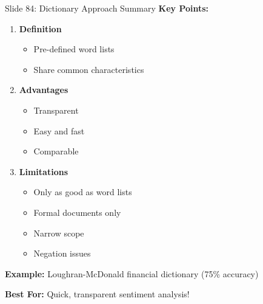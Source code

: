 \documentclass[8pt]{beamer}
\begin{document}
	\begin{frame}{Slide 84: Dictionary Approach Summary}
		\fontsize{6.5}{7.5}\selectfont
		\textbf{Key Points:}
		\begin{enumerate}
			\item \textbf{Definition}
			\begin{itemize}
				\item Pre-defined word lists
				\item Share common characteristics
			\end{itemize}
			\item \textbf{Advantages}
			\begin{itemize}
				\item Transparent
				\item Easy and fast
				\item Comparable
			\end{itemize}
			\item \textbf{Limitations}
			\begin{itemize}
				\item Only as good as word lists
				\item Formal documents only
				\item Narrow scope
				\item Negation issues
			\end{itemize}
		\end{enumerate}
		
		\vspace{0.1cm}
		\textbf{Example:} Loughran-McDonald financial dictionary (75\% accuracy)
		
		\textcolor{myblue}{\textbf{Best For:}} Quick, transparent sentiment analysis!
	\end{frame}
	
\end{document}

